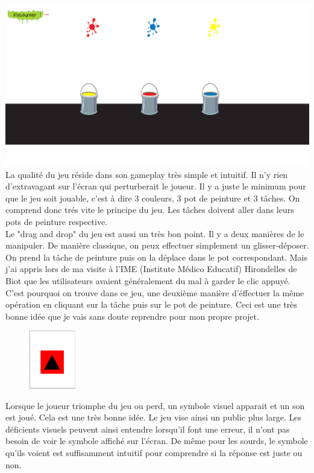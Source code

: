 \documentclass{article}
\begin{document}
\vspace{0.5cm}
\includegraphics[width=\textwidth]{4}\\
\hspace*{0.6cm}La qualit\'e du jeu r\'eside dans son gameplay tr\`es simple et intuitif. Il n'y rien d'extravagant sur l'\'ecran qui perturberait le joueur. Il y a juste le minimum pour que le jeu soit jouable, c'est \`a dire 3 couleurs, 3 pot de peinture et 3 t\^aches. On comprend donc tr\'es vite le principe du jeu. Les t\^aches doivent aller dans leurs pots de peinture respective.
\vspace{0.5cm}\\
\hspace*{0.6cm}Le "drag and drop" du jeu est aussi un tr\`es bon point. Il y a deux mani\`eres de le manipuler. De mani\`ere classique, on peux effectuer simplement un glisser-d\'eposer. On prend la t\^ache de peinture puis on la d\'eplace dans le pot correspondant. Mais j'ai appris lors de ma visite \`a l'IME (Institute M\'edico Educatif) Hirondelles de Biot que les utilisateurs avaient g\'en\'eralement du mal \`a garder le clic appuy\'e. C'est pourquoi on trouve dans ce jeu, une deuxi\`eme mani\`ere d'\'effectuer la m\^eme op\'eration en cliquant sur la t\^ache puis sur le pot de peinture. Ceci est une tr\`es bonne id\'ee que je vais sans doute reprendre pour mon propre projet.
\vspace{0.5cm}\\
\begin{figure}
\vspace{-13pt}
\centering
\includegraphics[width=2cm]{5}
\end{figure}
{\hspace*{0.6cm}Lorsque le joueur triomphe du jeu ou perd, un symbole visuel apparait et un son est jou\'e. Cela est une tr\`es bonne id\'ee. Le jeu vise ainsi un public plus large. Les d\'eficients visuels peuvent ainsi entendre lorsqu'il font une erreur, il n'ont pas besoin de voir le symbole affich\'e sur l'\'ecran. De m\^eme pour les sourds, le symbole qu'ils voient est suffisamment intuitif pour comprendre si la r\'eponse est juste ou non.}\\
\end{document}
